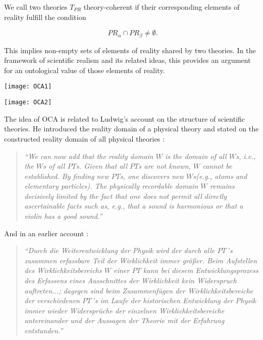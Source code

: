 \documentclass{article}
\begin{document}
We call two theories $ T_{PR} $ theory-coherent if their corresponding elements of reality fulfill the condition

\begin{equation}
PR_\alpha \cap PR_\beta \neq \emptyset.
\end{equation}

This implies non-empty sets of elements of reality shared by two theories. In the framework of scientific realism and its related ideas, this provides an argument for an ontological value of those elements of reality. 



\begin{minipage}{\textwidth}
\centering
\texttt{[image: OCA1]}
\end{minipage}
\bigskip

\begin{minipage}{\textwidth}
\centering
\texttt{[image: OCA2]}
\end{minipage}
\bigskip




The idea of OCA is related to Ludwig's account on the structure of scientific theories. He introduced the reality domain of a physical theory and stated on the constructed reality domain of all physical theories \cite[p.14]{ludwig2007new}:

\begin{quote}
\textit{``We can now add that the reality domain $W$ is the domain of all $W$s, i.e., the $W$s of all $PT$s. Given that all $PT$s are not known, $W$ cannot be established. By finding new $PT$s, one discovers new $W$s(e.g., atoms and elementary particles). The physically recordable domain $W$ remains decisively limited by the fact that one does not permit all directly ascertainable facts such as, e.g., that a sound is harmonious or that a violin has a good sound.''}
\end{quote}

And in an earlier account \cite[p.186]{ludwig1978grundstrukturen}:

\begin{quote}
\textit{``Durch die Weiterentwicklung der Physik wird der durch alle $PT$´s zusammen erfassbare Teil der Wirklichkeit immer größer. Beim Aufstellen des Wirklichkeitsbereichs $W$ einer $PT$ kann bei diesem Entwicklungsprozess des Erfassens eines Ausschnittes der Wirklichkeit kein Widerspruch auftreten...; dagegen sind beim Zusammenfügen der Wirklichkeitsbereiche der verschiedenen $PT$´s im Laufe der historischen Entwicklung der Physik immer wieder Widersprüche der einzelnen Wirklichkeitsbereiche untereinander und der Aussagen der Theorie mit der Erfahrung entstanden.''}
\end{quote}
\end{document}
